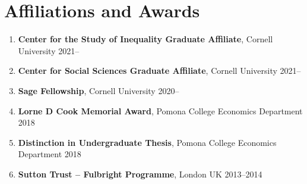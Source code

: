 \documentclass[letterpaper,11pt,oneside]{article}
\begin{document}
\section*{Affiliations and Awards}
\begin{enumerate}[itemsep=2pt, label={}]
    \item \textbf{Center for the Study of Inequality Graduate Affiliate}, Cornell University \hfill 2021--
    \item \textbf{Center for Social Sciences Graduate Affiliate}, Cornell University \hfill 2021--
    \item \textbf{Sage Fellowship}, Cornell University \hfill 2020--
    \item \textbf{Lorne D Cook Memorial Award}, Pomona College Economics Department \hfill 2018
    \item \textbf{Distinction in Undergraduate Thesis}, Pomona College Economics Department \hfill 2018
    \item \textbf{Sutton Trust -- Fulbright Programme}, London UK \hfill 2013--2014
\end{enumerate}
\end{document}
